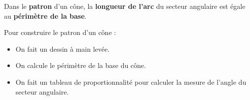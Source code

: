 \begin{pageCours}
\begin{Rq}
Dans le \textbf{patron} d'un cône, la \textbf{longueur de l'arc} du secteur angulaire est égale au \textbf{périmètre de la base}.
\end{Rq}

\begin{Mt}
Pour construire le patron d'un cône :
\begin{itemize}
\item On fait un dessin à main levée.
\item On calcule le périmètre de la base du cône.
\item On fait un tableau de proportionnalité pour calculer la mesure de l'angle du secteur angulaire.
\end{itemize}
\end{Mt}

%
%
%

\end{pageCours}
